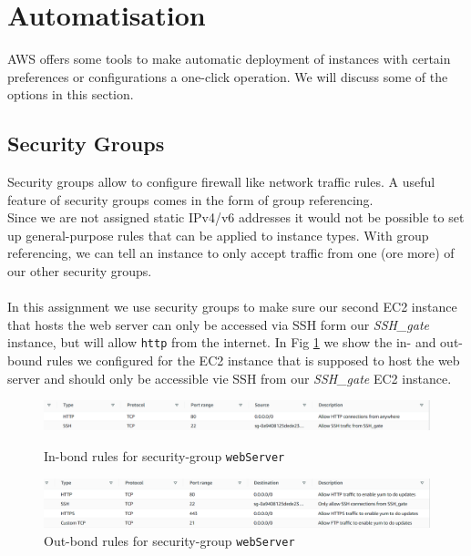 \section{Automatisation}

AWS offers some tools to make automatic deployment of instances with certain preferences or configurations a one-click operation. We will discuss some of the options in this section.

\subsection*{Security Groups}
Security groups allow to configure firewall like network traffic rules. A useful feature of security groups comes in the form of group referencing.\\
Since we are not assigned static IPv4/v6 addresses it would not be possible to set up general-purpose rules that can be applied to instance types. With group referencing, we can tell an instance to only accept traffic from one (ore more) of our other security groups.\\
\\
In this assignment we use security groups to make sure our second EC2 instance that hosts the web server can only be accessed via SSH form our \textsl{SSH\_gate} instance, but will allow \texttt{http} from the internet.
In Fig \ref{fig:sec_group_rules_webServer} we show the in- and out-bound rules we configured for the EC2 instance that is supposed to host the web server and should only be accessible vie SSH from our \textsl{SSH\_gate} EC2 instance.

\begin{figure}
	\includegraphics[width=\linewidth]{figures/webserver_sec_group_inbound.png}
	\caption{In-bond rules for security-group \texttt{webServer}}
	\includegraphics[width=\linewidth]{figures/webserver_sec_group_outbound.png}
	\caption{Out-bond rules for security-group \texttt{webServer}}
	\label{fig:sec_group_rules_webServer}
\end{figure}


